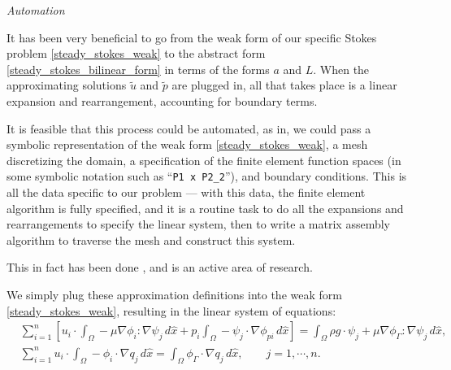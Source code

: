 \begin{aside}
\textit{Automation}
\vskip 0.1in

It has been very beneficial to go from the weak form of our specific Stokes problem
\eqref{steady_stokes_weak} to the abstract form \eqref{steady_stokes_bilinear_form} in terms of the forms $a$ and $L$.
When the approximating solutions $\tilde{u}$ and $\tilde{p}$ are plugged in, all that
takes place is a linear expansion and rearrangement, accounting for boundary terms.

It is feasible that this process could be automated, as in, we could pass a symbolic representation of the weak form
\eqref{steady_stokes_weak}, a mesh discretizing the domain, a specification of the finite element function spaces
(in some symbolic notation such as ``\texttt{P1 x P2\_2}''),
and boundary conditions. This is all the data specific to our problem --- with this data, the finite element algorithm
is fully specified, and it is a routine task to do all the expansions and rearrangements to specify the linear system,
then to write a matrix assembly algorithm to traverse the mesh and construct this system.

This in fact has been done
\cite{fenics_book} \cite{DOLFIN} \cite{firedrake} \cite{automating_fem},
and is an active area of research.

\end{aside}





We simply plug these approximation definitions into the weak form \eqref{steady_stokes_weak}, resulting in the
linear system of equations:
\begin{equation}\label{steady_stokes_linear_system}
\begin{split}
&\sum_{i=1}^n \left[u_i\cdot \int_\Omega -\mu\nabla\phi_i : \nabla\psi_j\,d\hat{x}
        + p_i\int_{\Omega} -\psi_j \cdot \nabla\phi_{pi}\,d\hat{x}\right]
    = \int_\Omega \rho g\cdot\psi_j
        + \mu\nabla\phi_\Gamma :\nabla\psi_j \,d\hat{x},\\
&\sum_{i=1}^n u_i \cdot \int_\Omega -\phi_i \cdot \nabla q_j \,d\hat{x}
    = \int_\Omega \phi_\Gamma \cdot \nabla q_j \,d\hat{x},
\quad\quad j=1,\cdots,n.
\end{split}
\end{equation}

